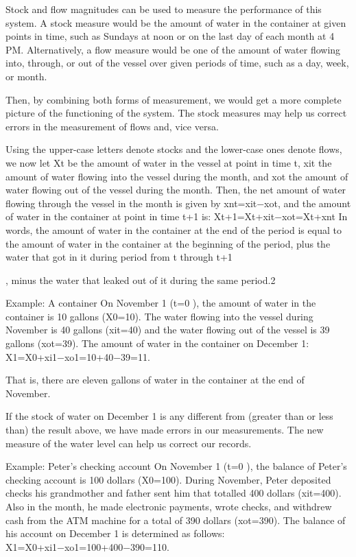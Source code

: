 \documentclass[
]{article}
\begin{document}
Stock and flow magnitudes can be used to measure the performance of this
system. A stock measure would be the amount of water in the container at
given points in time, such as Sundays at noon or on the last day of each
month at 4 PM. Alternatively, a flow measure would be one of the amount
of water flowing into, through, or out of the vessel over given periods
of time, such as a day, week, or month.

Then, by combining both forms of measurement, we would get a more
complete picture of the functioning of the system. The stock measures
may help us correct errors in the measurement of flows and, vice versa.

Using the upper-case letters denote stocks and the lower-case ones
denote flows, we now let Xt be the amount of water in the vessel at
point in time t, xit the amount of water flowing into the vessel during
the month, and xot the amount of water flowing out of the vessel during
the month. Then, the net amount of water flowing through the vessel in
the month is given by xnt=xit−xot, and the amount of water in the
container at point in time t+1 is: Xt+1=Xt+xit−xot=Xt+xnt In words, the
amount of water in the container at the end of the period is equal to
the amount of water in the container at the beginning of the period,
plus the water that got in it during period from t through t+1

, minus the water that leaked out of it during the same period.2

Example: A container On November 1 (t=0 ), the amount of water in the
container is 10 gallons (X0=10). The water flowing into the vessel
during November is 40 gallons (xit=40) and the water flowing out of the
vessel is 39 gallons (xot=39). The amount of water in the container on
December 1: X1=X0+xi1−xo1=10+40−39=11.

That is, there are eleven gallons of water in the container at the end
of November.

If the stock of water on December 1 is any different from (greater than
or less than) the result above, we have made errors in our measurements.
The new measure of the water level can help us correct our records.

Example: Peter's checking account On November 1 (t=0 ), the balance of
Peter's checking account is 100 dollars (X0=100). During November, Peter
deposited checks his grandmother and father sent him that totalled 400
dollars (xit=400). Also in the month, he made electronic payments, wrote
checks, and withdrew cash from the ATM machine for a total of 390
dollars (xot=390). The balance of his account on December 1 is
determined as follows: X1=X0+xi1−xo1=100+400−390=110.
\end{document}
